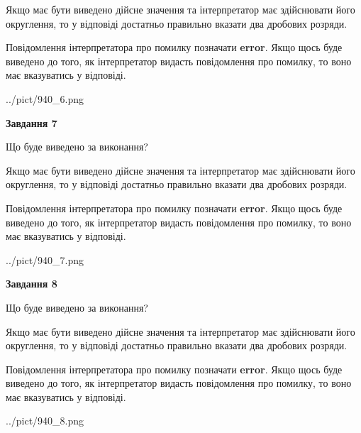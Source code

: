 \documentclass[12pt, ukrainian]{article}
\begin{document}
{\begin {Large}
Якщо має бути виведено дійсне значення та інтерпретатор має здійснювати його округлення, 
то у відповіді достатньо правильно вказати два дробових розряди.

Повідомлення інтерпретатора про помилку позначати \textbf{error}.
Якщо щось буде виведено до того, як інтерпретатор видасть повідомлення про помилку, 
то воно має вказуватись у відповіді. \par

\begin{center}
	{../pict/940_6.png}
\end{center}
\newpage

{\begin {center}\textbf{Завдання 7}\end {center}}\par
Що буде виведено за виконання? \par

Якщо має бути виведено дійсне значення та інтерпретатор має здійснювати його округлення, 
то у відповіді достатньо правильно вказати два дробових розряди.

Повідомлення інтерпретатора про помилку позначати \textbf{error}.
Якщо щось буде виведено до того, як інтерпретатор видасть повідомлення про помилку, 
то воно має вказуватись у відповіді. \par

\begin{center}
	{../pict/940_7.png}
\end{center}
\newpage

{\begin {center}\textbf{Завдання 8}\end {center}}\par
Що буде виведено за виконання? \par

Якщо має бути виведено дійсне значення та інтерпретатор має здійснювати його округлення, 
то у відповіді достатньо правильно вказати два дробових розряди.

Повідомлення інтерпретатора про помилку позначати \textbf{error}.
Якщо щось буде виведено до того, як інтерпретатор видасть повідомлення про помилку, 
то воно має вказуватись у відповіді. \par

\begin{center}
	{../pict/940_8.png}
\end{center}
\newpage


\end{Large}}
\end{document}
